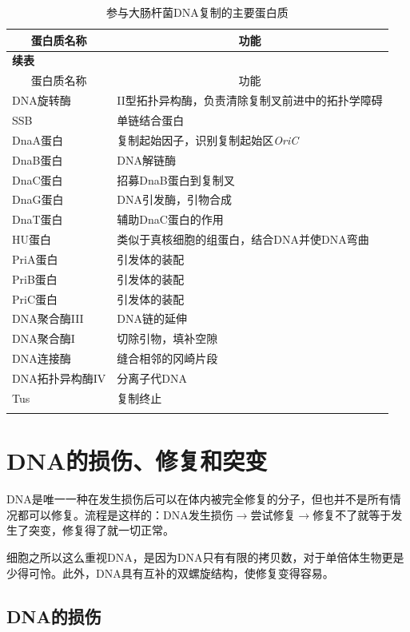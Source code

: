 \begin{longtable}[c]{|l|l|}
	\hline
	\multicolumn{1}{|c|}{蛋白质名称} & \multicolumn{1}{c|}{功能} \\ \hline
	\endfirsthead
	\multicolumn{2}{l}{\textbf{续表}} \\
	\hline
	\multicolumn{1}{|c|}{蛋白质名称} & \multicolumn{1}{c|}{功能} \\ \hline
	\endhead
	DNA旋转酶 & II型拓扑异构酶，负责清除复制叉前进中的拓扑学障碍 \\ \hline
	SSB & 单链结合蛋白 \\ \hline
	DnaA蛋白 & 复制起始因子，识别复制起始区\textit{OriC} \\ \hline
	DnaB蛋白 & DNA解链酶 \\ \hline
	DnaC蛋白 & 招募DnaB蛋白到复制叉 \\ \hline
	DnaG蛋白 & DNA引发酶，引物合成 \\ \hline
	DnaT蛋白 & 辅助DnaC蛋白的作用 \\ \hline
	HU蛋白 & 类似于真核细胞的组蛋白，结合DNA并使DNA弯曲 \\ \hline
	PriA蛋白 & 引发体的装配 \\ \hline
	PriB蛋白 & 引发体的装配 \\ \hline
	PriC蛋白 & 引发体的装配 \\ \hline
	DNA聚合酶III & DNA链的延伸 \\ \hline
	DNA聚合酶I & 切除引物，填补空隙 \\ \hline
	DNA连接酶 & 缝合相邻的冈崎片段 \\ \hline
	DNA拓扑异构酶IV & 分离子代DNA \\ \hline
	Tus & 复制终止
	 \\ \hline
	\caption{参与大肠杆菌DNA复制的主要蛋白质}
	\label{tab:ecoli_DNA_duplicatipn}
\end{longtable}





\section{DNA的损伤、修复和突变}

DNA是唯一一种在发生损伤后可以在体内被完全修复的分子，但也并不是所有情况都可以修复。流程是这样的：DNA发生损伤$\longrightarrow$尝试修复$\longrightarrow$修复不了就等于发生了突变，修复得了就一切正常。

细胞之所以这么重视DNA，是因为DNA只有有限的拷贝数，对于单倍体生物更是少得可怜。此外，DNA具有互补的双螺旋结构，使修复变得容易。
\subsection{DNA的损伤}

